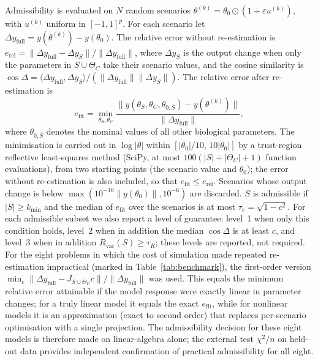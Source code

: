 \documentclass[pdflatex,sn-nature]{sn-jnl}
\theoremstyle{plain}
\begin{document}
Admissibility is evaluated on $N$ random scenarios $\theta^{(k)}=\theta_0\odot(1+\varepsilon u^{(k)})$, with $u^{(k)}$ uniform in $[-1,1]^p$. For each scenario let $\Delta y_{\mathrm{full}}=y(\theta^{(k)})-y(\theta_0)$. The relative error without re-estimation is $e_{\mathrm{rel}}=\|\Delta y_{\mathrm{full}}-\Delta y_S\|/\|\Delta y_{\mathrm{full}}\|$, where $\Delta y_S$ is the output change when only the parameters in $S\cup\Theta_C$ take their scenario values, and the cosine similarity is $\cos\Delta=\langle\Delta y_{\mathrm{full}},\Delta y_S\rangle/(\|\Delta y_{\mathrm{full}}\|\|\Delta y_S\|)$. The relative error after re-estimation is
\begin{equation}
e_{\mathrm{fit}}=\min_{\theta_{S},\theta_C}\frac{\|y(\theta_S,\theta_C,\theta_{0,\overline{S}})-y(\theta^{(k)})\|}{\|\Delta y_{\mathrm{full}}\|},
\label{eq:efit}
\end{equation}
where $\theta_{0,\overline{S}}$ denotes the nominal values of all other biological parameters. The minimisation is carried out in $\log|\theta|$ within $[|\theta_0|/10,\,10|\theta_0|]$ by a trust-region reflective least-squares method (SciPy\cite{bib33}, at most $100(|S|+|\Theta_C|+1)$ function evaluations), from two starting points (the scenario value and $\theta_0$); the error without re-estimation is also included, so that $e_{\mathrm{fit}}\le e_{\mathrm{rel}}$. Scenarios whose output change is below $\max(10^{-10}\|y(\theta_0)\|,10^{-6})$ are discarded. $S$ is admissible if $|S|\ge k_{\min}$ and the median of $e_{\mathrm{fit}}$ over the scenarios is at most $\tau_e=\sqrt{1-c^2}$. For each admissible subset we also report a level of guarantee: level~1 when only this condition holds, level~2 when in addition the median $\cos\Delta$ is at least $c$, and level~3 when in addition $R_{\mathrm{var}}(S)\ge\tau_R$; these levels are reported, not required. For the eight problems in which the cost of simulation made repeated re-estimation impractical (marked in Table~\ref{tab:benchmark}), the first-order version $\min_c\|\Delta y_{\mathrm{full}}-J_{S\cup\Theta_C}c\|/\|\Delta y_{\mathrm{full}}\|$ was used. This equals the minimum relative error attainable if the model response were exactly linear in parameter changes; for a truly linear model it equals the exact $e_{\mathrm{fit}}$, while for nonlinear models it is an approximation (exact to second order) that replaces per-scenario optimisation with a single projection. The admissibility decision for these eight models is therefore made on linear-algebra alone; the external test $\chi^2/n$ on held-out data provides independent confirmation of practical admissibility for all eight.
\end{document}
